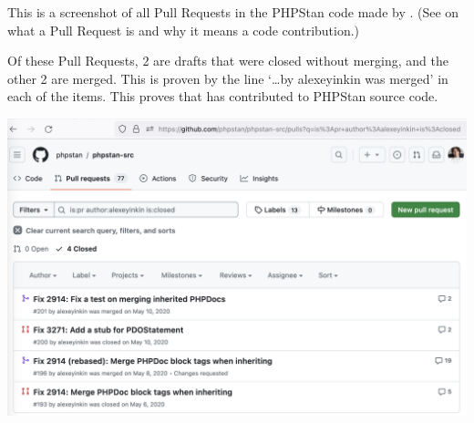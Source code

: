 
This is a screenshot of all Pull Requests in the PHPStan code made by \mrl.
(See  on what a Pull Request is and why it means a code contribution.)

Of these Pull Requests, 2 are drafts that were closed without merging,
and the other 2 are merged.
This is proven by the line `\dots by alexeyinkin was merged' in each of the items.
This proves that \mrl has contributed to PHPStan source code.

\begin{center}
    \includegraphics[width=\textwidth]{prs}
\end{center}

\pagebreak
